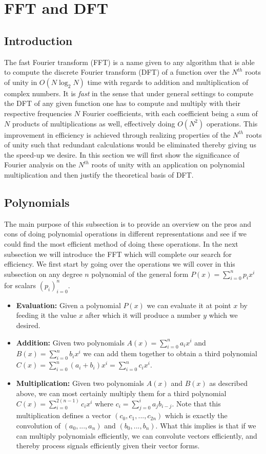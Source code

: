 \documentclass[12pt]{article}
\begin{document}
\section{FFT and DFT}
\subsection{Introduction}
The fast Fourier transform (FFT) is a name given to any algorithm that is able to compute the discrete Fourier transform (DFT) of a function over the $N^{th}$ roots of unity in $O(N\log_2{N})$ time with regards to addition and multiplication of complex numbers. It is \emph{fast} in the sense that under general settings to compute the DFT of any given function one has to compute and multiply with their respective frequencies $N$ Fourier coefficients, with each coefficient being a sum of $N$ products of multiplications as well, effectively doing $O(N^2)$ operations. This improvement in efficiency is achieved through realizing properties of the $N^{th}$ roots of unity such that redundant calculations would be eliminated thereby giving us the speed-up we desire. In this section we will first show the significance of Fourier analysis on the $N^{th}$ roots of unity with an application on polynomial multiplication and then justify the theoretical basis of DFT.

\subsection{Polynomials}
The main purpose of this subsection is to provide an overview on the pros and cons of doing polynomial operations in different representations and see if we could find the most efficient method of doing these operations. In the next subsection we will introduce the FFT which will complete our search for efficiency.  We first start by going over the operations we will cover in this subsection on any degree $n$ polynomial of the general form $P(x) = \sum_{i=0}^{n} p_ix^i$ for scalars $(p_i)_{i=0}^{n}$.

\begin{itemize}
\item{\textbf{Evaluation:}} Given a polynomial $P(x)$ we can evaluate it at point $x$ by feeding it the value $x$ after which it will produce a number $y$ which we desired.
\item{\textbf{Addition:}} Given two polynomials $A(x) = \sum_{i=0}^{n} a_ix^i$ and $B(x) = \sum_{i=0}^{n} b_ix^i$ we can add them together to obtain a third polynomial $C(x) = \sum_{i=0}^{n} (a_i+b_i)x^i = \sum_{i=0}^{n} c_ix^i$.
\item {\textbf{Multiplication:}} Given two polynomials $A(x)$ and $B(x)$ as described above, we can most certainly multiply them for a third polynomial $C(x) = \sum_{i=0}^{2(n-1)} c_ix^i$ where $c_i = \sum_{j=0}^{i} a_jb_{i-j}$. Note that this multiplication defines a vector $(c_0, c_1, ..., c_{2n})$ which is exactly the convolution of $(a_0,..., a_n)$ and $(b_0, ..., b_n)$. What this implies is that if we can multiply polynomials efficiently, we can convolute vectors efficiently, and thereby process signals efficiently given their vector forms.
\end{itemize}
\end{document}
